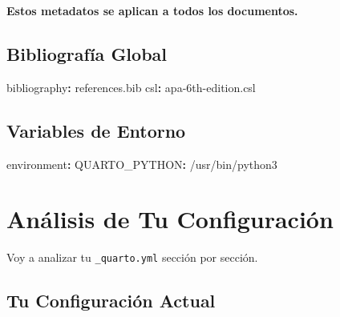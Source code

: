 \documentclass[
  doc,
  floatsintext,
  longtable,
  a4paper,
  nolmodern,
  notxfonts,
  notimes,
  12pt,
  colorlinks=true,linkcolor=blue,citecolor=blue,urlcolor=blue]{apa7}
\newenvironment{Shaded}{\begin{snugshade}}{\end{snugshade}}
\newcommand{\AttributeTok}[1]{\textcolor[rgb]{0.40,0.45,0.13}{#1}}
\newcommand{\FunctionTok}[1]{\textcolor[rgb]{0.28,0.35,0.67}{#1}}
\newcommand{\KeywordTok}[1]{\textcolor[rgb]{0.00,0.23,0.31}{\textbf{#1}}}
\begin{document}
\textbf{Estos metadatos se aplican a todos los documentos.}

\subsection{Bibliografía Global}\label{bibliografuxeda-global}

\begin{Shaded}
\begin{Highlighting}[]
\FunctionTok{bibliography}\KeywordTok{:}\AttributeTok{ references.bib}
\FunctionTok{csl}\KeywordTok{:}\AttributeTok{ apa{-}6th{-}edition.csl}
\end{Highlighting}
\end{Shaded}

\subsection{Variables de Entorno}\label{variables-de-entorno}

\begin{Shaded}
\begin{Highlighting}[]
\FunctionTok{environment}\KeywordTok{:}
\AttributeTok{  }\FunctionTok{QUARTO\_PYTHON}\KeywordTok{:}\AttributeTok{ /usr/bin/python3}
\end{Highlighting}
\end{Shaded}

\section{Análisis de Tu
Configuración}\label{anuxe1lisis-de-tu-configuraciuxf3n}

Voy a analizar tu \texttt{\_quarto.yml} sección por sección.

\subsection{Tu Configuración Actual}\label{tu-configuraciuxf3n-actual}
\end{document}
